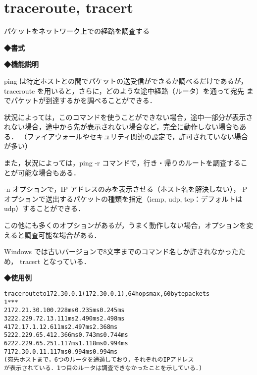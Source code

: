 
\section{traceroute, tracert}
パケットをネットワーク上での経路を調査する\par
\label{cmd:traceroute}
\noindent
{\bf ◆書式}
\begin{center}
\begin{screen}
\begin{alltt}
% traceroute [宛先ホスト名 or IPアドレス]
\end{alltt}
\end{screen}
\end{center}

\noindent
{\bf ◆機能説明}

ping は特定ホストとの間でパケットの送受信ができるか調べるだけであるが，
traceroute を用いると，さらに，どのような途中経路（ルータ）を通って宛先
までパケットが到達するかを調べることができる．

状況によっては，このコマンドを使うことができない場合，途中一部分が表示さ
れない場合，途中から先が表示されない場合など，完全に動作しない場合もある．
（ファイアウォールやセキュリティ関連の設定で，許可されていない場合が多い）

また，状況によっては，ping -r コマンドで，行き・帰りのルートを調査するこ
とが可能な場合もある．

-n オプションで，IP アドレスのみを表示させる（ホスト名を解決しない），-P 
 オプションで送出するパケットの種類を指定（icmp, udp, tcp：デフォルトは 
 udp）することができる．

この他にも多くのオプションがあるが，うまく動作しない場合，オプションを変
えると調査可能な場合がある．

Windows では古いバージョンで8文字までのコマンド名しか許されなかったため，
tracert となっている．

\noindent
{\bf ◆使用例}
\begin{center}
\begin{breakbox}
\begin{alltt}
% \underline{traceroute -n -P icmp 172.30.0.1}
traceroute to 172.30.0.1 (172.30.0.1), 64 hops max, 60 byte packets
 1  * * *
 2  172.21.30.10  0.228 ms  0.235 ms  0.245 ms
 3  222.229.72.1  3.111 ms  2.490 ms  2.498 ms
 4  172.17.1.1  2.611 ms  2.497 ms  2.368 ms
 5  222.229.65.41  2.366 ms  0.743 ms  0.744 ms
 6  222.229.65.25  1.117 ms  1.118 ms  0.994 ms
 7  172.30.0.1  1.117 ms  0.994 ms  0.994 ms
%
(宛先ホストまで，6つのルータを通過しており，それぞれの IP アドレス
 が表示されている．1つ目のルータは調査できなかったことを示している．)
\end{alltt}
\end{breakbox}
\end{center}
\clearpage
